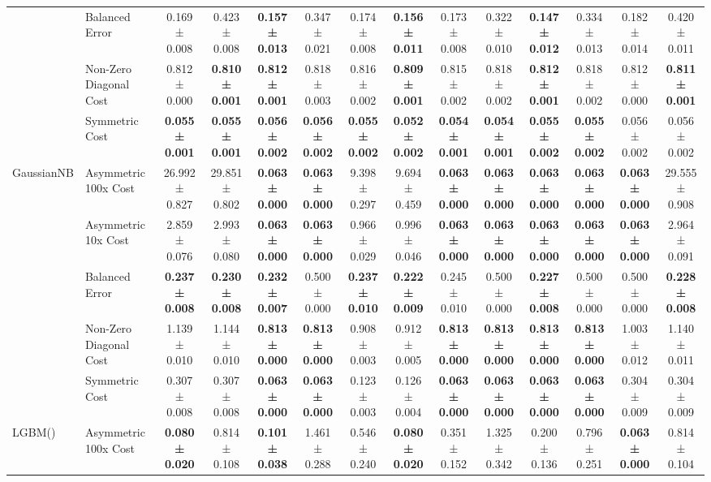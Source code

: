 \begin{table}[H]
{\begin{tabular}{llcccccccccccc}
 & Balanced Error & 0.169 ± 0.008 & 0.423 ± 0.008 & \textbf{0.157 ± 0.013} & 0.347 ± 0.021 & 0.174 ± 0.008 & \textbf{0.156 ± 0.011} & 0.173 ± 0.008 & 0.322 ± 0.010 & \textbf{0.147 ± 0.012} & 0.334 ± 0.013 & 0.182 ± 0.014 & 0.420 ± 0.011 \\
 & Non-Zero Diagonal Cost & 0.812 ± 0.000 & \textbf{0.810 ± 0.001} & \textbf{0.812 ± 0.001} & 0.818 ± 0.003 & 0.816 ± 0.002 & \textbf{0.809 ± 0.001} & 0.815 ± 0.002 & 0.818 ± 0.002 & \textbf{0.812 ± 0.001} & 0.818 ± 0.002 & 0.812 ± 0.000 & \textbf{0.811 ± 0.001} \\
 & Symmetric Cost & \textbf{0.055 ± 0.001} & \textbf{0.055 ± 0.001} & \textbf{0.056 ± 0.002} & \textbf{0.056 ± 0.002} & \textbf{0.055 ± 0.002} & \textbf{0.052 ± 0.002} & \textbf{0.054 ± 0.001} & \textbf{0.054 ± 0.001} & \textbf{0.055 ± 0.002} & \textbf{0.055 ± 0.002} & 0.056 ± 0.002 & 0.056 ± 0.002 \\
\cline{1-14}
\multirow[t]{5}{*}{GaussianNB} & Asymmetric 100x Cost & 26.992 ± 0.827 & 29.851 ± 0.802 & \textbf{0.063 ± 0.000} & \textbf{0.063 ± 0.000} & 9.398 ± 0.297 & 9.694 ± 0.459 & \textbf{0.063 ± 0.000} & \textbf{0.063 ± 0.000} & \textbf{0.063 ± 0.000} & \textbf{0.063 ± 0.000} & \textbf{0.063 ± 0.000} & 29.555 ± 0.908 \\
 & Asymmetric 10x Cost & 2.859 ± 0.076 & 2.993 ± 0.080 & \textbf{0.063 ± 0.000} & \textbf{0.063 ± 0.000} & 0.966 ± 0.029 & 0.996 ± 0.046 & \textbf{0.063 ± 0.000} & \textbf{0.063 ± 0.000} & \textbf{0.063 ± 0.000} & \textbf{0.063 ± 0.000} & \textbf{0.063 ± 0.000} & 2.964 ± 0.091 \\
 & Balanced Error & \textbf{0.237 ± 0.008} & \textbf{0.230 ± 0.008} & \textbf{0.232 ± 0.007} & 0.500 ± 0.000 & \textbf{0.237 ± 0.010} & \textbf{0.222 ± 0.009} & 0.245 ± 0.010 & 0.500 ± 0.000 & \textbf{0.227 ± 0.008} & 0.500 ± 0.000 & 0.500 ± 0.000 & \textbf{0.228 ± 0.008} \\
 & Non-Zero Diagonal Cost & 1.139 ± 0.010 & 1.144 ± 0.010 & \textbf{0.813 ± 0.000} & \textbf{0.813 ± 0.000} & 0.908 ± 0.003 & 0.912 ± 0.005 & \textbf{0.813 ± 0.000} & \textbf{0.813 ± 0.000} & \textbf{0.813 ± 0.000} & \textbf{0.813 ± 0.000} & 1.003 ± 0.012 & 1.140 ± 0.011 \\
 & Symmetric Cost & 0.307 ± 0.008 & 0.307 ± 0.008 & \textbf{0.063 ± 0.000} & \textbf{0.063 ± 0.000} & 0.123 ± 0.003 & 0.126 ± 0.004 & \textbf{0.063 ± 0.000} & \textbf{0.063 ± 0.000} & \textbf{0.063 ± 0.000} & \textbf{0.063 ± 0.000} & 0.304 ± 0.009 & 0.304 ± 0.009 \\
\cline{1-14}
\multirow[t]{5}{*}{LGBM()} & Asymmetric 100x Cost & \textbf{0.080 ± 0.020} & 0.814 ± 0.108 & \textbf{0.101 ± 0.038} & 1.461 ± 0.288 & 0.546 ± 0.240 & \textbf{0.080 ± 0.020} & 0.351 ± 0.152 & 1.325 ± 0.342 & 0.200 ± 0.136 & 0.796 ± 0.251 & \textbf{0.063 ± 0.000} & 0.814 ± 0.104 \\

\end{tabular}}
\end{table}
